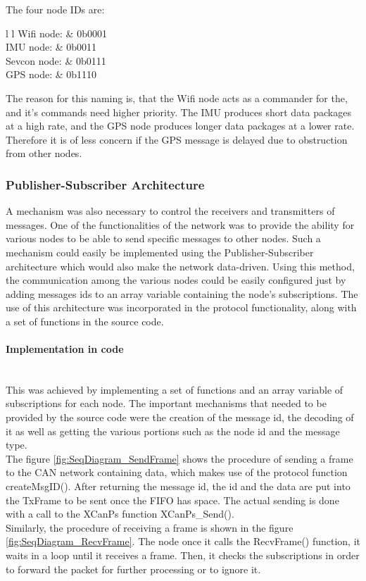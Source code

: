 The four node IDs are:
\begin{table}[h]
	\begin{tabular}{{l} {l}}
		Wifi node: & 0b0001 \\
		IMU node: & 0b0011 \\
		Sevcon node: & 0b0111 \\
		GPS node: & 0b1110
	\end{tabular}
\end{table}

The reason for this naming is, that the Wifi node acts as a commander for the, and it's commands need higher priority.
The IMU produces short data packages at a high rate, and the GPS node produces longer data packages at a lower rate. 
Therefore it is of less concern if the GPS message is delayed due to obstruction from other nodes. 

\subsubsection{Publisher-Subscriber Architecture}
A mechanism was also necessary to control the receivers and transmitters of messages.
One of the functionalities of the network was to provide the ability for various nodes to be able to send specific messages to other nodes.
Such a mechanism could easily be implemented using the Publisher-Subscriber architecture which would also make the network data-driven.
Using this method, the communication among the various nodes could be easily configured just by adding messages ids to an array variable containing the node's subscriptions.
The use of this architecture was incorporated in the protocol functionality, along with a set of functions in the source code.
\paragraph{Implementation in code}~\\
This was achieved by implementing a set of functions and an array variable of subscriptions for each node.
The important mechanisms that needed to be provided by the source code were the creation of the message id, the decoding of it as well as getting the various portions such as the node id and the message type.
\\
The figure \ref{fig:SeqDiagram_SendFrame} shows the procedure of sending a frame to the CAN network containing data, which makes use of the protocol function createMsgID().
After returning the message id, the id and the data are put into the TxFrame to be sent once the FIFO has space.
The actual sending is done with a call to the XCanPs function XCanPs\_Send().
\\
Similarly, the procedure of receiving a frame is shown in the figure \ref{fig:SeqDiagram_RecvFrame}.
The node once it calls the RecvFrame() function, it waits in a loop until it receives a frame. Then, it checks the subscriptions in order to forward the packet for further processing or to ignore it.

